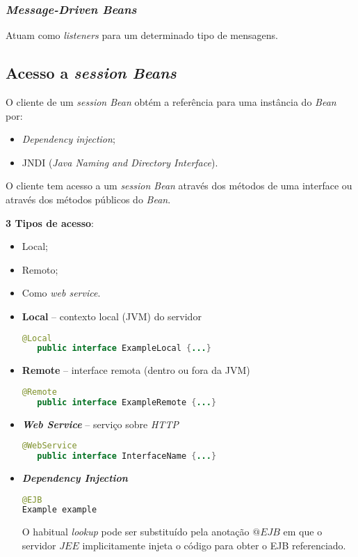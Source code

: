 \documentclass{article}
\begin{document}
\subsubsection{\textit{Message-Driven Beans}}

Atuam como \textit{listeners} para um determinado tipo de mensagens.

\subsection{Acesso a \textit{session Beans}}

O cliente de um \textit{session Bean} obtém a referência para uma instância do \textit{Bean} por:

\begin{itemize}
	\item \textit{Dependency injection};
	\item JNDI (\textit{Java Naming and Directory Interface}).
\end{itemize}

O cliente tem acesso a um \textit{session Bean} através dos métodos de uma interface ou através dos métodos públicos do \textit{Bean}.

\textbf{3 Tipos de acesso}:

\begin{itemize}
	\item Local;
	\item Remoto;
	\item Como \textit{web service}.
\end{itemize}

\begin{itemize}

\item \textbf{Local} -- contexto local (JVM) do servidor
\begin{lstlisting}[language=Java]
   @Local
   public interface ExampleLocal {...}
\end{lstlisting}

\item \textbf{Remote} -- interface remota (dentro ou fora da JVM)
\begin{lstlisting}[language=Java]
   @Remote
   public interface ExampleRemote {...}
\end{lstlisting}

\item \textbf{\textit{Web Service}} -- serviço sobre \textit{HTTP}
\begin{lstlisting}[language=Java]
   @WebService
   public interface InterfaceName {...}
\end{lstlisting}

\item \textbf{\textit{Dependency Injection}}
\begin{lstlisting}[language=Java]
@EJB
Example example
\end{lstlisting}

O habitual \textit{lookup} pode ser substituído pela anotação $@EJB$ em que o servidor $JEE$ implicitamente injeta o código para obter o EJB referenciado.

\end{itemize}
\end{document}
